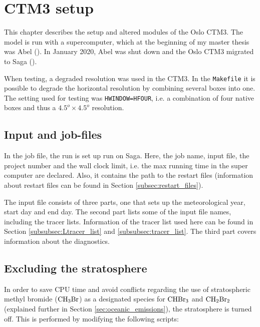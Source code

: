 \setcounter{chapter}{4}
\chapter{CTM3 setup}

This chapter describes the setup and altered modules of the Oslo CTM3. The model is run with a supercomputer, which at the beginning of my master thesis was Abel (\cite{abel}). In January 2020, Abel was shut down and the Oslo CTM3 migrated to Saga (\cite{saga}). 

\medskip

When testing, a degraded resolution was used in the CTM3. In the \texttt{Makefile} it is possible to degrade the horizontal resolution by combining several boxes into one. The setting used for testing was \texttt{HWINDOW=HFOUR}, i.e. a combination of four native boxes and thus a $4.5^o \times 4.5^o$ resolution. 



\section{Input and job-files}

In the job file, the run is set up run on Saga. Here, the job name, input file, the project number and  the wall clock limit, i.e. the max running time in the super computer are declared. Also, it contains the path to the restart files (information about restart files can be found in Section \ref{subsec:restart_files}).

\medskip

The input file consists of three parts, one that sets up the meteorological year, start day and end day. The second part lists some of the input file names, including the tracer lists. Information of the tracer list used here can be found in Section \ref{subsubsec:Ltracer_list} and \ref{subsubsec:tracer_list}. The third part covers information about the diagnostics. 


\section{Excluding the stratosphere}\label{subsec:strat}

In order to save CPU time and avoid conflicts regarding the use of stratospheric methyl bromide ($\mathrm{CH_3Br}$) as a designated species for $\mathrm{CHBr_3}$ and $\mathrm{CH_2Br_2}$ (explained further in Section \ref{sec:oceanic_emissions}), the stratosphere is turned off. This is performed by modifying the following scripts: 

